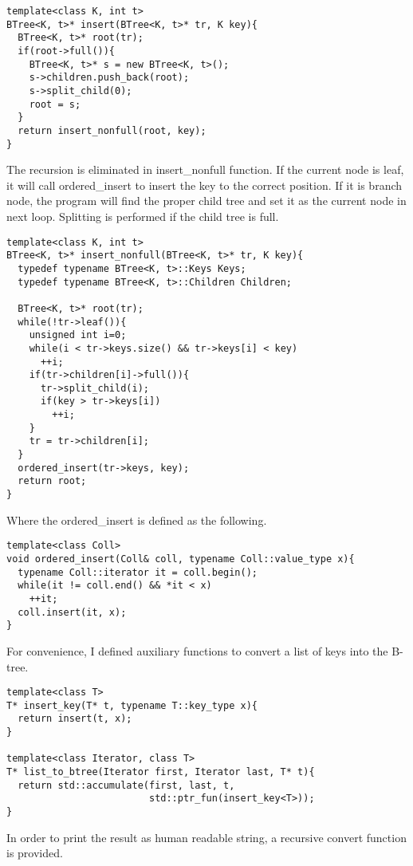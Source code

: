 \documentclass{article}
\begin{document}
\lstset{language=C++}
\begin{lstlisting}
template<class K, int t>
BTree<K, t>* insert(BTree<K, t>* tr, K key){
  BTree<K, t>* root(tr);
  if(root->full()){
    BTree<K, t>* s = new BTree<K, t>();
    s->children.push_back(root);
    s->split_child(0);
    root = s;
  }
  return insert_nonfull(root, key);
}
\end{lstlisting}

The recursion is eliminated in insert\_nonfull function. If the current
node is leaf, it will call ordered\_insert to insert the key to the correct
position. If it is branch node, the program will find the proper child
tree and set it as the current node in next loop. Splitting is performed
if the child tree is full.

\begin{lstlisting}
template<class K, int t>
BTree<K, t>* insert_nonfull(BTree<K, t>* tr, K key){
  typedef typename BTree<K, t>::Keys Keys;
  typedef typename BTree<K, t>::Children Children;

  BTree<K, t>* root(tr);
  while(!tr->leaf()){
    unsigned int i=0;
    while(i < tr->keys.size() && tr->keys[i] < key)
      ++i;
    if(tr->children[i]->full()){
      tr->split_child(i);
      if(key > tr->keys[i])
        ++i;
    }
    tr = tr->children[i];
  }
  ordered_insert(tr->keys, key);
  return root;
}
\end{lstlisting}

Where the ordered\_insert is defined as the following.

\begin{lstlisting}
template<class Coll>
void ordered_insert(Coll& coll, typename Coll::value_type x){
  typename Coll::iterator it = coll.begin();
  while(it != coll.end() && *it < x)
    ++it;
  coll.insert(it, x);
}
\end{lstlisting}

For convenience, I defined auxiliary functions to convert a
list of keys into the B-tree.

\begin{lstlisting}
template<class T>
T* insert_key(T* t, typename T::key_type x){
  return insert(t, x);
}

template<class Iterator, class T>
T* list_to_btree(Iterator first, Iterator last, T* t){
  return std::accumulate(first, last, t,
                         std::ptr_fun(insert_key<T>));
}
\end{lstlisting}

In order to print the result as human readable string, a recursive
convert function is provided.
\end{document}
